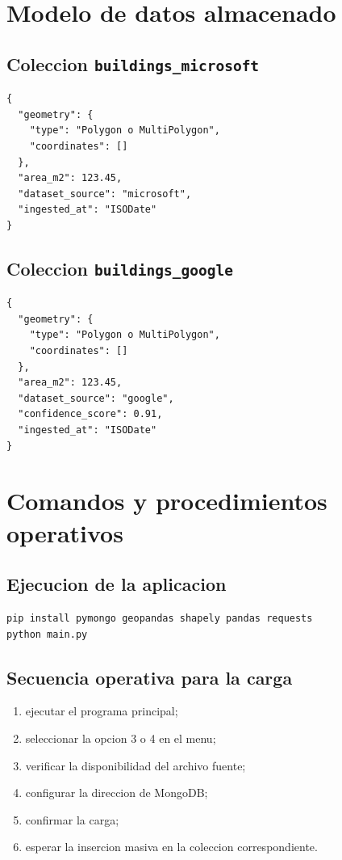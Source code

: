 \documentclass[12pt]{article}
\begin{document}
\section{Modelo de datos almacenado}

\subsection{Coleccion \texttt{buildings\_microsoft}}

\begin{lstlisting}[style=basicstyle,language={} ]
{
  "geometry": {
    "type": "Polygon o MultiPolygon",
    "coordinates": []
  },
  "area_m2": 123.45,
  "dataset_source": "microsoft",
  "ingested_at": "ISODate"
}
\end{lstlisting}

\subsection{Coleccion \texttt{buildings\_google}}

\begin{lstlisting}[style=basicstyle,language={} ]
{
  "geometry": {
    "type": "Polygon o MultiPolygon",
    "coordinates": []
  },
  "area_m2": 123.45,
  "dataset_source": "google",
  "confidence_score": 0.91,
  "ingested_at": "ISODate"
}
\end{lstlisting}

\section{Comandos y procedimientos operativos}

\subsection{Ejecucion de la aplicacion}

\begin{lstlisting}[style=basicstyle,language=bash]
pip install pymongo geopandas shapely pandas requests
python main.py
\end{lstlisting}

\subsection{Secuencia operativa para la carga}

\begin{enumerate}[leftmargin=*]
    \item ejecutar el programa principal;
    \item seleccionar la opcion 3 o 4 en el menu;
    \item verificar la disponibilidad del archivo fuente;
    \item configurar la direccion de MongoDB;
    \item confirmar la carga;
    \item esperar la insercion masiva en la coleccion correspondiente.
\end{enumerate}
\end{document}
